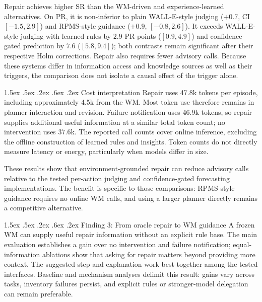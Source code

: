 \documentclass[runningheads]{llncs}
\makeatletter
\renewcommand\paragraph{\@startsection{paragraph}{4}{\z@}%
  {1.5ex \@plus .5ex \@minus .2ex}%
  {.6ex \@plus .2ex}%
  {\normalfont\normalsize\bfseries}}
\makeatother
\begin{document}
Repair achieves higher SR than the WM-driven and experience-learned alternatives. On PR, it is non-inferior to plain WALL-E-style judging ($+0.7$, CI $[-1.5,2.9]$) and RPMS-style guidance ($+0.9$, $[-0.8,2.6]$). It exceeds WALL-E-style judging with learned rules by $2.9$ PR points ($[0.9,4.9]$) and confidence-gated prediction by $7.6$ ($[5.8,9.4]$); both contrasts remain significant after their respective Holm corrections. Repair also requires fewer advisory calls. Because these systems differ in information access and knowledge sources as well as their triggers, the comparison does not isolate a causal effect of the trigger alone.

\paragraph{Cost interpretation}
Repair uses 47.8k tokens per episode, including approximately 4.5k from the WM. Most token use therefore remains in planner interaction and revision. Failure notification uses 46.9k tokens, so repair supplies additional useful information at a similar total token count; no intervention uses 37.6k. The reported call counts cover online inference, excluding the offline construction of learned rules and insights. Token counts do not directly measure latency or energy, particularly when models differ in size.

These results show that environment-grounded repair can reduce advisory calls relative to the tested per-action judging and confidence-gated forecasting implementations. The benefit is specific to those comparisons: RPMS-style guidance requires no online WM calls, and using a larger planner directly remains a competitive alternative.

\paragraph{Finding 3: From oracle repair to WM guidance}
A frozen WM can supply useful repair information without an explicit rule base. The main evaluation establishes a gain over no intervention and failure notification; equal-information ablations show that asking for repair matters beyond providing more context. The suggested step and explanation work best together among the tested interfaces. Baseline and mechanism analyses delimit this result: gains vary across tasks, inventory failures persist, and explicit rules or stronger-model delegation can remain preferable.
\end{document}
